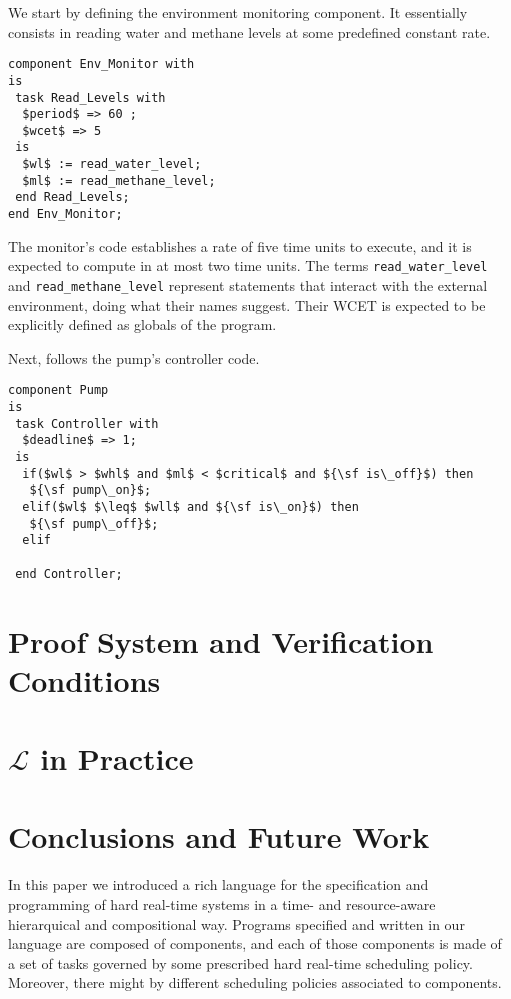 \documentclass{llncs}
\begin{document}
We start by defining the environment monitoring component. It essentially consists in reading water and methane levels at some predefined constant rate.
\begin{lstlisting}
component Env_Monitor with
is
 task Read_Levels with 
  $period$ => 60 ; 
  $wcet$ => 5
 is
  $wl$ := read_water_level;
  $ml$ := read_methane_level;
 end Read_Levels;
end Env_Monitor;
\end{lstlisting}
The monitor's code establishes a rate of five time units to execute, and it is expected to compute in at most two time units. The terms {\tt read\_water\_level} and {\tt read\_methane\_level} represent statements that interact with the external environment, doing what their names suggest. Their WCET is expected to be explicitly defined as globals of the program. 

Next, follows the pump's controller code. 
\begin{lstlisting}
component Pump
is
 task Controller with
  $deadline$ => 1;
 is
  if($wl$ > $whl$ and $ml$ < $critical$ and ${\sf is\_off}$) then 
   ${\sf pump\_on}$;
  elif($wl$ $\leq$ $wll$ and ${\sf is\_on}$) then
   ${\sf pump\_off}$;
  elif

 end Controller;
\end{lstlisting}


\section{Proof System and Verification Conditions}

\section{$\mathcal{L}$ in Practice}

\section{Conclusions and Future Work}

In this paper we introduced a rich language for the specification and programming of hard real-time systems in a time- and resource-aware hierarquical and compositional way. Programs specified and written in our language are composed of components, and each of those components is made of a set of tasks governed by some prescribed hard real-time scheduling policy. Moreover, there might by different scheduling policies associated to components.
\end{document}
